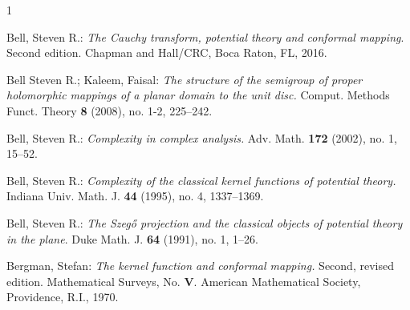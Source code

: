 \documentclass[11pt, reqno]{amsart}
\numberwithin{equation}{section}
\begin{document}
	
	\begin{thebibliography}{1}
		
		Bell, Steven R.: \textit{The Cauchy transform, potential theory and conformal mapping}. Second edition. Chapman and Hall/CRC, Boca Raton, FL, 2016.
		
		Bell Steven R.; Kaleem, Faisal:
		\textit{The structure of the semigroup of proper holomorphic mappings of a planar domain to the unit disc.}
		Comput. Methods Funct. Theory \textbf{8} (2008), no. 1-2, 225–242. 
		
		Bell, Steven R.: \textit{Complexity in complex analysis.}
		Adv. Math. \textbf{172} (2002), no. 1, 15–52.
		
		
		
		Bell, Steven R.:  \textit{Complexity of the classical kernel functions of potential theory.}
		Indiana Univ. Math. J. \textbf{44} (1995), no. 4, 1337–1369.
		
		Bell, Steven R.: \textit{The Szegő projection and the classical objects of potential theory in the plane}.
		Duke Math. J. \textbf{64} (1991), no. 1, 1–26.
		
		Bergman, Stefan: \textit{The kernel function and conformal mapping.}
		Second, revised edition. Mathematical Surveys, No. \textbf{V}. American Mathematical Society, Providence, R.I., 1970.
		


		

\end{thebibliography}
\end{document}
